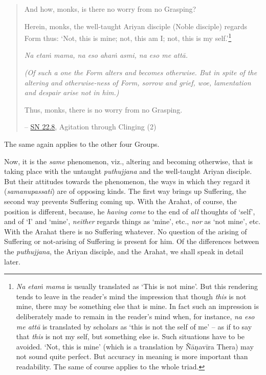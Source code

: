 \begin{quote}
And how, monks, is there no worry from no Grasping?

Herein, monks, the well-taught Ariyan disciple (Noble disciple) regards Form thus: `Not, this is mine; not, this am I; not, this is my self.'\footnote{\textit{Na etaṁ mama} is usually translated as `This is not mine'. But this rendering tends to leave in the reader's mind the impression that though \emph{this} is not mine, there may be something else that is mine. In fact such an impression is deliberately made to remain in the reader's mind when, for instance, \textit{na eso me attā} is translated by scholars as `this is not the self of me' -- as if to say that \emph{this} is not my self, but something else is. Such situations have to be avoided. `Not, this is mine' (which is a translation by Ñāṇavīra Thera) may not sound quite perfect. But accuracy in meaning is more important than readability. The same of course applies to the whole triad.}

\textit{Na etaṁ mama, na eso ahaṁ asmi, na eso me attā.}

\textit{(Of such a one the Form alters and becomes otherwise. But in spite of the altering and otherwise-ness of Form, sorrow and grief, woe, lamentation and despair arise not in him.)}

Thus, monks, there is no worry from no Grasping.

 -- \href{https://suttacentral.net/sn22.8/en/bodhi}{SN 22.8}, Agitation through Clinging (2)
\end{quote}

The same again applies to the other four Groups.

Now, it is the \emph{same} phenomenon, viz., altering and becoming otherwise, that is taking place with the untaught \textit{puthujjana} and the well-taught Ariyan disciple. But their attitudes towards the phenomenon, the ways in which they regard it (\textit{samanupassati}) are of opposing kinds. The first way brings up Suffering, the second way prevents Suffering coming up. With the Arahat, of course, the position is different, because, he \emph{having come} to the end of \emph{all} thoughts of `self', and of `I' and `mine', \emph{neither} regards things as `mine', etc., \emph{nor} as `not mine', etc. With the Arahat there is no Suffering whatever. No question of the arising of Suffering or not-arising of Suffering is present for him. Of the differences between the \textit{puthujjana}, the Ariyan disciple, and the Arahat, we shall speak in detail later.

